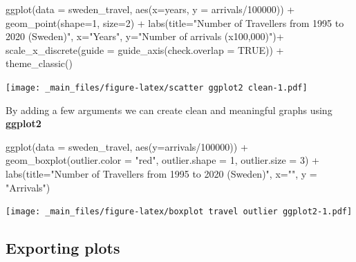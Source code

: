 \documentclass[
]{book}
\newenvironment{Shaded}{\begin{snugshade}}{\end{snugshade}}
\newcommand{\AttributeTok}[1]{\textcolor[rgb]{0.77,0.63,0.00}{#1}}
\newcommand{\ConstantTok}[1]{\textcolor[rgb]{0.00,0.00,0.00}{#1}}
\newcommand{\DecValTok}[1]{\textcolor[rgb]{0.00,0.00,0.81}{#1}}
\newcommand{\FunctionTok}[1]{\textcolor[rgb]{0.00,0.00,0.00}{#1}}
\newcommand{\NormalTok}[1]{#1}
\newcommand{\SpecialCharTok}[1]{\textcolor[rgb]{0.00,0.00,0.00}{#1}}
\newcommand{\StringTok}[1]{\textcolor[rgb]{0.31,0.60,0.02}{#1}}
\begin{document}
\begin{Shaded}
\begin{Highlighting}[]
\FunctionTok{ggplot}\NormalTok{(}\AttributeTok{data =}\NormalTok{ sweden\_travel, }\FunctionTok{aes}\NormalTok{(}\AttributeTok{x=}\NormalTok{years, }\AttributeTok{y =}\NormalTok{ arrivals}\SpecialCharTok{/}\DecValTok{100000}\NormalTok{)) }\SpecialCharTok{+} 
  \FunctionTok{geom\_point}\NormalTok{(}\AttributeTok{shape=}\DecValTok{1}\NormalTok{,}
             \AttributeTok{size=}\DecValTok{2}\NormalTok{) }\SpecialCharTok{+}
  \FunctionTok{labs}\NormalTok{(}\AttributeTok{title=}\StringTok{"Number of Travellers from 1995 to 2020 (Sweden)"}\NormalTok{,}
     \AttributeTok{x=}\StringTok{"Years"}\NormalTok{,}
     \AttributeTok{y=}\StringTok{"Number of arrivals (x100,000)"}\NormalTok{)}\SpecialCharTok{+}
  \FunctionTok{scale\_x\_discrete}\NormalTok{(}\AttributeTok{guide =} \FunctionTok{guide\_axis}\NormalTok{(}\AttributeTok{check.overlap =} \ConstantTok{TRUE}\NormalTok{)) }\SpecialCharTok{+}
  \FunctionTok{theme\_classic}\NormalTok{()}
\end{Highlighting}
\end{Shaded}

\texttt{[image: \_main\_files/figure-latex/scatter ggplot2 clean-1.pdf]}

By adding a few arguments we can create clean and meaningful graphs using \textbf{ggplot2}

\begin{Shaded}
\begin{Highlighting}[]
\FunctionTok{ggplot}\NormalTok{(}\AttributeTok{data =}\NormalTok{ sweden\_travel, }\FunctionTok{aes}\NormalTok{(}\AttributeTok{y=}\NormalTok{arrivals}\SpecialCharTok{/}\DecValTok{100000}\NormalTok{)) }\SpecialCharTok{+} 
  \FunctionTok{geom\_boxplot}\NormalTok{(}\AttributeTok{outlier.color =} \StringTok{"red"}\NormalTok{, }\AttributeTok{outlier.shape =} \DecValTok{1}\NormalTok{, }\AttributeTok{outlier.size =} \DecValTok{3}\NormalTok{) }\SpecialCharTok{+}
  \FunctionTok{labs}\NormalTok{(}\AttributeTok{title=}\StringTok{"Number of Travellers from 1995 to 2020 (Sweden)"}\NormalTok{,}
       \AttributeTok{x=}\StringTok{""}\NormalTok{, }
       \AttributeTok{y =} \StringTok{"Arrivals"}\NormalTok{)}
\end{Highlighting}
\end{Shaded}

\texttt{[image: \_main\_files/figure-latex/boxplot travel outlier ggplot2-1.pdf]}

\hypertarget{exporting-plots}{%
\subsection{Exporting plots}\label{exporting-plots}}
\end{document}
